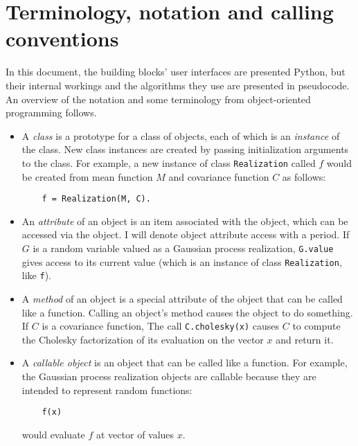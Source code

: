 \documentclass{report}
\begin{document}
\section{Terminology, notation and calling conventions}

In this document, the building blocks' user interfaces are presented Python, but their internal workings and the algorithms they use are presented in pseudocode. An overview of the notation and some terminology from object-oriented programming follows.

\begin{itemize}
    \item A \emph{class} is a prototype for a class of objects, each of which is an \emph{instance} of the class. New class instances are created by passing initialization arguments to the class. For example, a new instance of class \texttt{Realization} called $f$ would be created from mean function $M$ and covariance function $C$ as follows:
\begin{verbatim}
    f = Realization(M, C).
\end{verbatim}

    \item An \emph{attribute} of an object is an item associated with the object, which can be accessed via the object. I will denote object attribute access with a period. If $G$ is a random variable valued as a Gaussian process realization, \texttt{G.value} gives access to its current value (which is an instance of class \texttt{Realization}, like \texttt{f}).

    \item A \emph{method} of an object is a special attribute of the object that can be called like a function. Calling an object's method causes the object to do something. If $C$ is a covariance function, The call \texttt{C.cholesky(x)} causes $C$ to compute the Cholesky factorization of its evaluation on the vector $x$ and return it.

    \item A \emph{callable object} is an object that can be called like a function. For example, the Gaussian process realization objects are callable because they are intended to represent random functions:
\begin{verbatim}
    f(x)
\end{verbatim}
would evaluate $f$ at vector of values $x$.%
\end{itemize}
\end{document}
